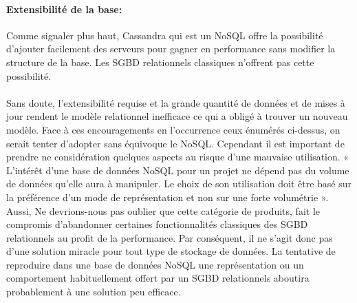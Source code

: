 \paragraph{Extensibilité de la base:} Comme signaler plus haut, \textsf{Cassandra} qui est un \textsf{NoSQL} offre la possibilité d'ajouter facilement des serveurs pour gagner en performance sans modifier la structure de la base. Les \textsf{SGBD} relationnels classiques n'offrent pas cette possibilité.
\\ \\ 
Sans doute, l'extensibilité requise et la grande quantité de données et de mises à jour rendent le modèle relationnel inefficace ce qui a obligé à trouver un nouveau modèle. 
Face à ces encouragements en l'occurrence ceux énumérés ci-dessus, on serait tenter
d'adopter sans équivoque le \textsf{NoSQL}. Cependant il est important
de prendre ne considération quelques aspects au risque d'une mauvaise
utilisation. « L’intérêt d’une base de données \textsf{NoSQL} pour un
  projet ne dépend pas du volume de données qu’elle aura à
  manipuler. Le choix de son utilisation doit être basé sur la
  préférence d’un mode de représentation et non sur une forte
  volumétrie »\cite{NoSQLeurope}. Aussi, Ne devrions-nous pas oublier
que cette catégorie de produits, fait le compromis d'abandonner certaines fonctionnalités classiques
des \textsf{SGBD} relationnels au profit de la performance. Par
conséquent, il ne s’agit donc pas d’une solution miracle pour tout
type de stockage de données.  La tentative de reproduire dans une base
de données \textsf{NoSQL} une représentation ou un comportement
habituellement offert par un \textsf{SGBD} relationnels aboutira
probablement à une solution peu efficace.

